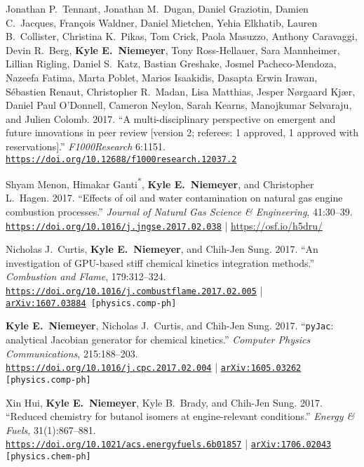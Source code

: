 \documentclass[margin,line,11pt]{res}
\makeatletter
\newlength{\bibhang}
\newlength{\bibsep}
 {\@listi \global\bibsep\itemsep \global\advance\bibsep by\parsep}
\newenvironment{bibenum*}
  {\renewcommand\labelenumi{\theenumi.}%
   \etaremune[
     topsep=0pt,
     itemsep=\bibsep,
     parsep=0pt,partopsep=0pt,
     itemindent=-\bibhang,
     leftmargin={\bibhang+\widthof{[999]}}]}
  {\endetaremune}
\newcommand*{\doi}[1]{\href{https://doi.org/#1}{\nolinkurl{https://doi.org/#1}}}
\newcommand*{\grad}[0]{\textsuperscript{*}}
\makeatother
\begin{document}
\begin{resume}
\begin{bibenum*}
\item Jonathan P.~Tennant, Jonathan M.~Dugan, Daniel Graziotin, Damien C.~Jacques,
Fran\c{c}ois Waldner, Daniel Mietchen, Yehia Elkhatib, Lauren B.~Collister,
Christina K.~Pikas, Tom Crick, Paola Masuzzo, Anthony Caravaggi, Devin R.~Berg,
\textbf{Kyle E.~Niemeyer}, Tony Ross-Hellauer, Sara Mannheimer, Lillian Rigling,
Daniel S.~Katz, Bastian Greshake, Josmel Pacheco-Mendoza, Nazeefa Fatima,
Marta Poblet, Marios Isaakidis, Dasapta Erwin Irawan, S\'{e}bastien Renaut,
Christopher R.~Madan, Lisa Matthias, Jesper N{\o}rgaard Kj\ae{}r,
Daniel Paul O'Donnell, Cameron Neylon, Sarah Kearns, Manojkumar Selvaraju,
and Julien Colomb.
2017.
``A multi-disciplinary perspective on emergent and future innovations in peer review [version 2; referees: 1 approved, 1 approved with reservations].''
\textit{F1000Research} 6:1151.
\doi{10.12688/f1000research.12037.2}

\item Shyam Menon, Himakar Ganti\grad{}, \textbf{Kyle E.~Niemeyer}, and Christopher L.~Hagen.
2017.
``Effects of oil and water contamination on natural gas engine combustion processes.''
\textit{Journal of Natural Gas Science \& Engineering}, 41:30--39.
\doi{10.1016/j.jngse.2017.02.038} | \url{https://osf.io/h5dru/}

\item Nicholas J.~Curtis, \textbf{Kyle E.~Niemeyer}, and Chih-Jen Sung.
2017.
``An investigation of GPU-based stiff chemical kinetics integration methods.''
\textit{Combustion and Flame}, 179:312--324.
\doi{10.1016/j.combustflame.2017.02.005} | \\
{\tt \href{https://arxiv.org/abs/1607.03884}{arXiv:1607.03884} [physics.comp-ph]}

\item \textbf{Kyle E.~Niemeyer}, Nicholas J.~Curtis, and Chih-Jen Sung.
2017.
``\texttt{pyJac}: analytical Jacobian generator for chemical kinetics.''
\textit{Computer Physics Communications}, 215:188--203. \\
\doi{10.1016/j.cpc.2017.02.004} |
{\tt \href{https://arxiv.org/abs/1605.03262}{arXiv:1605.03262} [physics.comp-ph]}

\item Xin Hui, \textbf{Kyle E.~Niemeyer}, Kyle B.~Brady, and Chih-Jen Sung.
2017.
``Reduced chemistry for butanol isomers at engine-relevant conditions.''
\textit{Energy \& Fuels}, 31(1):867--881. \\
\doi{10.1021/acs.energyfuels.6b01857} |
{\tt \href{https://arxiv.org/abs/1706.02043}{arXiv:1706.02043} [physics.chem-ph]}


\end{bibenum*}
\end{resume}
\end{document}

